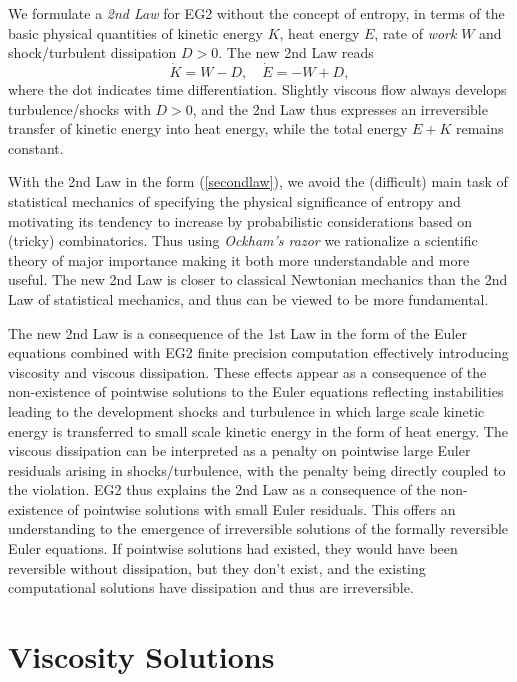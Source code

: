 We formulate a \emph{2nd Law} for EG2
without the concept of entropy, in terms of
the basic physical quantities of kinetic energy
$K$, heat energy $E$, rate of \emph{work} $W$ and shock/turbulent dissipation
$D>0$. The new 2nd Law reads
\begin{equation}\label{secondlaw}
\dot K=W-D,\quad \dot E=-W+D,
\end{equation}
where the dot indicates time differentiation. Slightly viscous
flow always develops turbulence/shocks with $D>0$, and the
2nd Law thus expresses an irreversible transfer of kinetic energy
into heat energy, while the total energy $E+K$ remains constant.

With the 2nd Law in the form (\ref{secondlaw}), we
avoid the (difficult) main task of
statistical mechanics
of specifying the physical significance of entropy and motivating its
tendency to increase by probabilistic considerations based on
(tricky) combinatorics. Thus using \emph{Ockham's razor} %
we rationalize a scientific theory of major importance making it both
more understandable and more useful. The new 2nd Law is closer to
classical Newtonian mechanics than the 2nd Law of statistical mechanics,
and thus can be viewed to be more fundamental.

The new 2nd Law is a consequence of the 1st Law
in the form of the Euler equations combined with EG2
finite precision computation effectively introducing
viscosity and viscous dissipation. These effects
appear as a consequence of the non-existence of pointwise solutions to
the Euler equations reflecting instabilities leading to
the development shocks and turbulence in which
large scale kinetic energy is transferred to small scale
kinetic energy in the form of heat energy. The viscous dissipation
can be interpreted as a penalty on pointwise
large Euler residuals arising in shocks/turbulence,
with the penalty being directly coupled to the violation. EG2
thus explains the 2nd Law as a consequence of
the non-existence of pointwise solutions with small Euler residuals.
This offers an understanding to the emergence of irreversible
solutions of the formally reversible Euler equations.
If pointwise solutions had existed, they would have been
reversible without dissipation, but they don't exist, and the
existing computational solutions have dissipation and thus are
irreversible.

\section{Viscosity Solutions}

